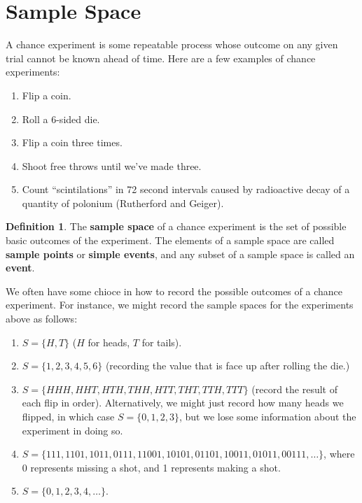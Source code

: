 \documentclass[
]{book}
\providecommand{\tightlist}{%
  \setlength{\itemsep}{0pt}\setlength{\parskip}{0pt}}
\theoremstyle{definition}
\newtheorem{definition}{Definition}[chapter]
\theoremstyle{definition}
\theoremstyle{definition}
\theoremstyle{definition}
\theoremstyle{remark}
\begin{document}
\section{Sample Space}\label{sample-space}

A chance experiment is some repeatable process whose outcome on any given trial cannot be known ahead of time. Here are a few examples of chance experiments:

\begin{enumerate}
\def\labelenumi{\arabic{enumi}.}
\tightlist
\item
  Flip a coin.
\item
  Roll a 6-sided die.
\item
  Flip a coin three times.
\item
  Shoot free throws until we've made three.
\item
  Count ``scintilations'' in 72 second intervals caused by radioactive decay of a quantity of polonium (Rutherford and Geiger).
\end{enumerate}

\begin{definition}
\protect\hypertarget{def:sample-space}{}\label{def:sample-space}The \textbf{sample space} of a chance experiment is the set of possible basic outcomes of the experiment. The elements of a sample space are called \textbf{sample points} or \textbf{simple events}, and any subset of a sample space is called an \textbf{event}.
\end{definition}

We often have some chioce in how to record the possible outcomes of a chance experiment. For instance, we might record the sample spaces for the experiments above as follows:

\begin{enumerate}
\def\labelenumi{\arabic{enumi}.}
\tightlist
\item
  \(S = \{ H, T \}\) (\(H\) for heads, \(T\) for tails).
\item
  \(S = \{1,2,3,4,5,6\}\) (recording the value that is face up after rolling the die.)
\item
  \(S = \{HHH,HHT,HTH,THH,HTT,THT,TTH,TTT\}\) (record the result of each flip in order). Alternatively, we might just record how many heads we flipped, in which case \(S = \{0,1,2,3\}\), but we lose some information about the experiment in doing so.
\item
  \(S = \{111, 1101, 1011, 0111, 11001, 10101, 01101, 10011, 01011, 00111, \ldots \}\), where 0 represents missing a shot, and 1 represents making a shot.
\item
  \(S = \{0, 1, 2, 3, 4, \ldots \}\).
\end{enumerate}
\end{document}
